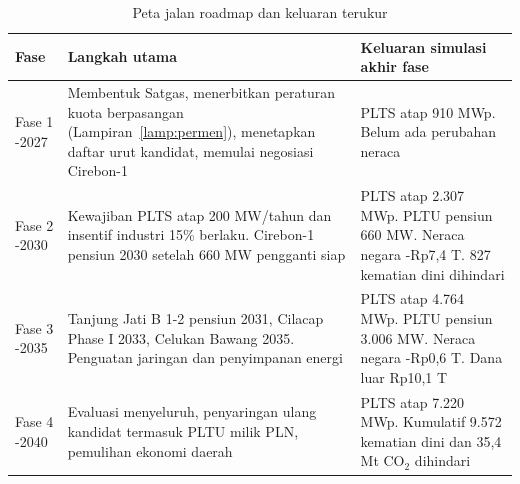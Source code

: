 \begin{table}[H]
\centering
\caption{Peta jalan roadmap dan keluaran terukur}
\label{tab:fase}
\small
\begin{tabularx}{\textwidth}{L{1.8cm} Y L{4.4cm}}
\toprule
Fase & Langkah utama & Keluaran simulasi akhir fase \\
\midrule
Fase 1 -2027 & Membentuk Satgas, menerbitkan peraturan kuota berpasangan (Lampiran~\ref{lamp:permen}), menetapkan daftar urut kandidat, memulai negosiasi Cirebon-1 & PLTS atap 910 MWp. Belum ada perubahan neraca \\
\addlinespace
Fase 2 -2030 & Kewajiban PLTS atap 200 MW/tahun dan insentif industri 15\% berlaku. Cirebon-1 pensiun 2030 setelah 660 MW pengganti siap & PLTS atap 2.307 MWp. PLTU pensiun 660 MW. Neraca negara -Rp7,4 T. 827 kematian dini dihindari \\
\addlinespace
Fase 3 -2035 & Tanjung Jati B 1-2 pensiun 2031, Cilacap Phase I 2033, Celukan Bawang 2035. Penguatan jaringan dan penyimpanan energi & PLTS atap 4.764 MWp. PLTU pensiun 3.006 MW. Neraca negara -Rp0,6 T. Dana luar Rp10,1 T \\
\addlinespace
Fase 4 -2040 & Evaluasi menyeluruh, penyaringan ulang kandidat termasuk PLTU milik PLN, pemulihan ekonomi daerah & PLTS atap 7.220 MWp. Kumulatif 9.572 kematian dini dan 35,4 Mt CO$_2$ dihindari \\
\bottomrule
\end{tabularx}
\end{table}
